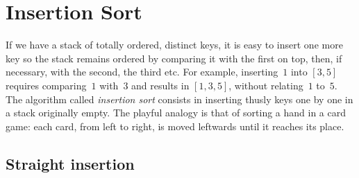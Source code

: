 \chapter{Insertion Sort}
\label{chap:insertion}

If we have a stack of totally ordered, distinct keys, it is easy to
insert one more key so the stack remains ordered by comparing it with
the first on top, then, if necessary, with the second, the third
etc. For example, inserting~\(1\) into \([3,5]\) requires
comparing~\(1\) with~\(3\) and results in \([1,3,5]\), without
relating~\(1\) to~\(5\). The algorithm called \emph{insertion sort}
\citep{Knuth_1998} consists in inserting thusly keys one by one in a stack
originally empty. The playful analogy is that of sorting a hand in a
card game: each card, from left to right, is moved leftwards until it
reaches its place.

\section{Straight insertion}
\label{sec:straight_ins}

